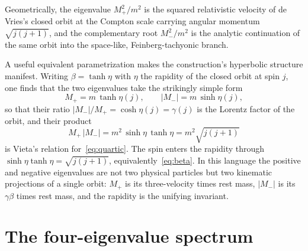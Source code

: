 \documentclass[twocolumn,aps,prd,floatfix,nofootinbib,superscriptaddress,10pt]{article}
\begin{document}
Geometrically, the eigenvalue $M^2_+/m^2$ is the squared relativistic velocity of de Vries's closed orbit at the Compton scale carrying angular momentum $\sqrt{j(j+1)}$, and the complementary root $M^2_-/m^2$ is the analytic continuation of the same orbit into the space-like, Feinberg-tachyonic branch.

A useful equivalent parametrization makes the construction's hyperbolic structure manifest. Writing $\beta = \tanh\eta$ with $\eta$ the rapidity of the closed orbit at spin $j$, one finds that the two eigenvalues take the strikingly simple form
\begin{equation}
M_+ = m\,\tanh\eta(j),\qquad |M_-| = m\,\sinh\eta(j),
\label{eq:rapidity}
\end{equation}
so that their ratio $|M_-|/M_+ = \cosh\eta(j) = \gamma(j)$ is the Lorentz factor of the orbit, and their product
\begin{equation}
M_+\,|M_-| = m^2\,\sinh\eta\,\tanh\eta = m^2\sqrt{j(j+1)}
\label{eq:vieta}
\end{equation}
is Vieta's relation for~\eqref{eq:quartic}. The spin enters the rapidity through $\sinh\eta\tanh\eta=\sqrt{j(j+1)}$, equivalently~\eqref{eq:beta}. In this language the positive and negative eigenvalues are not two physical particles but two kinematic projections of a single orbit: $M_+$ is its three-velocity times rest mass, $|M_-|$ is its $\gamma\beta$ times rest mass, and the rapidity is the unifying invariant.

\section{The four-eigenvalue spectrum}
\end{document}
